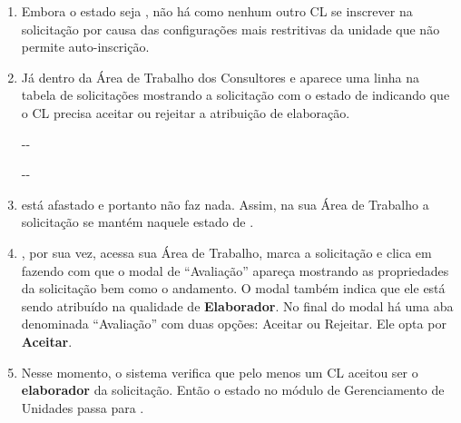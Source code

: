 \begin{landscape}
\begin{enumerate}
\begin{enumerate}
			\item Contudo, a solicitação não entra ainda no estado ``Em Elaboração'' porque pelo menos um dos CLs precisa aceitar a atribuição.			
			
			\item Neste momento, tanto \EU e \ED recebem, nos seus respectivos pools de notificação, uma mensagem padrão do sistema ``Você foi atribuído para ser \textbf{elaborador} da solicitação \SOLU. Por favor, acesse sua área de trabalho para avaliar a atribuição.'' 
		\end{enumerate}	
	
	{}{-}{-}{Indefinido}
	
	\item Embora o estado seja , não há como nenhum outro CL se inscrever na solicitação por causa das configurações mais restritivas da unidade que não permite auto-inscrição.	
	
	\item Já dentro da Área de Trabalho dos Consultores \EU e \ED aparece uma linha na tabela de solicitações mostrando a solicitação com o estado de  indicando que o CL precisa aceitar ou rejeitar a atribuição de elaboração.
	
	{}{-}{-}{\EU}

	{}{-}{-}{\ED}

	
	\item \EU está afastado e portanto não faz nada. Assim, na sua Área de Trabalho a solicitação se mantém naquele estado de .
	
	\item \ED, por sua vez, acessa sua Área de Trabalho, marca a solicitação \SOLU e clica em \bAvaliar fazendo com que o modal de ``Avaliação'' apareça mostrando as propriedades da solicitação bem como o andamento. O modal também indica que ele está sendo atribuído na qualidade de \textbf{Elaborador}. No final do modal há uma aba denominada ``Avaliação'' com duas opções: Aceitar ou Rejeitar. Ele opta por \textbf{Aceitar}.
	
	\item Nesse momento, o sistema verifica que pelo menos um CL aceitou ser o \textbf{elaborador} da solicitação. Então o estado no módulo de Gerenciamento de Unidades passa para . 


\end{enumerate}
\end{landscape}
